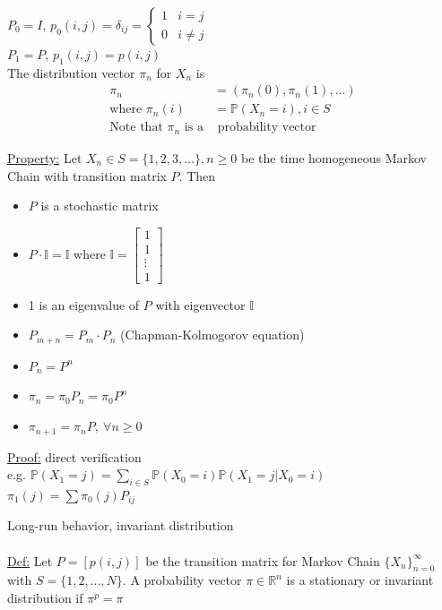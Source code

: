 \documentclass[12pt, letterpaper]{article}
\begin{document}
\noindent {} $P_0 = I$, $p_0(i,j) = \delta_{ij} = \begin{cases}
    1 & i = j \\
    0 & i \ne j
\end{cases}$ \\ 
$P_1 =P$, $p_1(i,j) = p(i,j)$ \\

\noindent The distribution vector $\pi_n$ for $X_n$ is 
\begin{align*}
    \pi_n &= (\pi_n(0), \pi_n(1), ...) \\ 
    \text{where } \pi_n(i) &= \mathbb{P}(X_n = i), i \in S \\
    \text{Note that } \pi_n \text{ is a} & \text{ probability vector}
\end{align*}

\noindent \underline{Property:} Let $X_n \in S = \{1,2,3,...\}, n \ge 0$ be the time 
homogeneous Markov Chain with transition matrix $P$. Then 
\begin{itemize}
    \item $P$ is a stochastic matrix
    \item $P \cdot \mathbb{I} = \mathbb{I}$ where $\mathbb{I} = \begin{bmatrix}
    1 \\ 1 \\ \vdots \\ 1
    \end{bmatrix}$
    \item 1 is an eigenvalue of $P$ with eigenvector $\mathbb{I}$
    \item $P_{m+n} = P_m \cdot P_n$ (Chapman-Kolmogorov equation)
    \item $P_n = P^n$
    \item $\pi_n = \pi_0 P_n = \pi_0 P^n$
    \item $\pi_{n+1} = \pi_n P,\ \forall n \ge 0$
\end{itemize}

\noindent \underline{Proof:} direct verification \\
e.g. $\mathbb{P}(X_1 = j) = \sum_{i \in S} \mathbb{P}(X_0 = i) \mathbb{P}(X_1 = j | X_0 = i)$ \\
$\pi_1(j) = \sum \pi_0 (j)P_{ij}$

Long-run behavior, invariant distribution\\\\
\underline{Def:} Let $P = [p(i,j)]$ be the transition matrix for Markov Chain $\{X_n\}_{n=0}^\infty$ with $S = \{1,2,..., N\}$.
A probability vector $\pi \in \mathbb{R}^n$ is a stationary or invariant distribution if $\pi^p = \pi$
\end{document}
